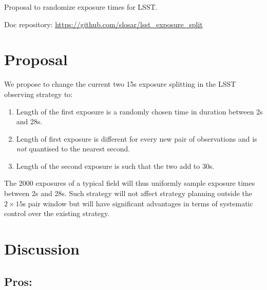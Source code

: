 \documentclass[12pt, a4paper]{article}
\begin{document}
\begin{center}
{\Huge
  Proposal to randomize exposure times for LSST.
}
\end{center}



{\small
Doc repository: \url{https://github.com/slosar/lsst_exposure_split}
}

\section*{Proposal}

We propose to change the current two 15s exposure splitting in the
LSST observing strategy to:

\begin{enumerate}
  
\item Length of the first exposure is a randomly chosen time in
  duration between 2s and 28s.

\item Length of first exposure is different for every new pair of
  observations and is \emph{not} quantised to the nearest second.

\item Length of the second exposure is such that the two add to 30s.
\end{enumerate}

The 2000 exposures of a typical field will thus uniformly sample
exposure times between 2s and 28s. Such strategy will not affect
strategy planning outside the $2\times 15$s pair window but will have significant
advantages in terms of systematic control over the existing strategy.

\section*{Discussion}

\subsection*{Pros:}
\end{document}
